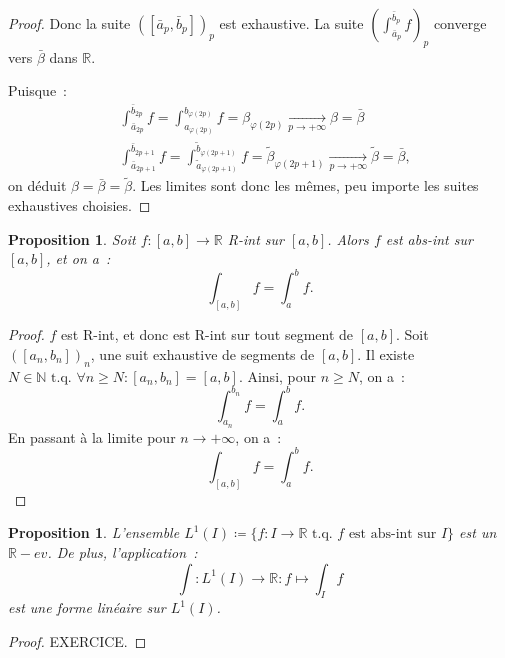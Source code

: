 \documentclass{report}
\newtheorem{prp}[thm]{Proposition}
\theoremstyle{definition}
\theoremstyle{remark}
\numberwithin{equation}{section}
\newcommand{\R}{\mathbb R}
\newcommand{\N}{\mathbb N}
\newcommand{\tq}{\text{ t.q. }}
\newcommand{\pinfty}{{+\infty}}
\begin{document}
\begin{proof}
			Donc la suite $([\bar a_p, \bar b_p])_p$ est exhaustive. La suite $\left(\int_{\bar a_p}^{\bar b_p}f\right)_p$ converge vers $\bar \beta$ dans $\R$.

			Puisque~:
			\begin{align}
				&\int_{\bar a_{2p}}^{\bar b_{2p}}f = \int_{a_{\varphi(2p)}}^{b_{\varphi(2p)}}f = \beta_{\varphi(2p)} \xrightarrow[p \to \pinfty]{} \beta = \bar \beta \\
				&\int_{\bar a_{2p+1}}^{\bar b_{2p+1}} f = \int_{\widetilde a_{\varphi(2p+1)}}^{\widetilde b_{\varphi(2p+1)}} f
					= \widetilde \beta_{\varphi(2p+1)} \xrightarrow[p \to \pinfty]{} \widetilde \beta = \bar \beta,
			\end{align}
			on déduit $\beta = \bar \beta = \widetilde \beta$. Les limites sont donc les mêmes, peu importe les suites exhaustives choisies.
			\end{proof}

			\begin{prp} Soit $f : [a, b] \to \R$ R-int sur $[a, b]$. Alors $f$ est abs-int sur $[a, b]$, et on a~:
			\begin{equation}
				\int_{[a, b]} f = \int_a^b f.
			\end{equation}
			\end{prp}

			\begin{proof} $f$ est R-int, et donc est R-int sur tout segment de $[a, b]$. Soit $([a_n, b_n])_n$, une suit exhaustive de segments de $[a, b]$. Il existe
			$N \in \N \tq \forall n \geq N : [a_n, b_n] = [a, b]$. Ainsi, pour $n \geq N$, on a~:
			\begin{equation}
				\int_{a_n}^{b_n} f = \int_a^b f.
			\end{equation}
			En passant à la limite pour $n \to \pinfty$, on a~:
			\begin{equation}
				\int_{[a, b]} f = \int_a^b f.
			\end{equation}
			\end{proof}

			\begin{prp} L'ensemble $L^1(I) \coloneqq \{f : I \to \R \tq f \text{ est abs-int sur } I\}$ est un $\R-ev$. De plus, l'application~:
			\begin{equation}
				\int : L^1(I) \to \R : f \mapsto \int_I f
			\end{equation}
			est une forme linéaire sur $L^1(I)$.
			\end{prp}

			\begin{proof} EXERCICE.
			\end{proof}
\end{document}
